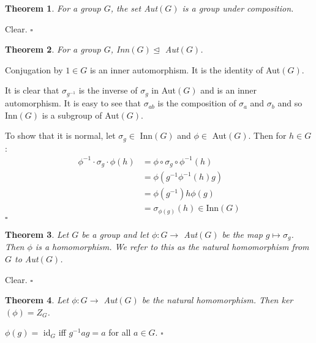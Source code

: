 \documentclass[10pt]{article}
\newtheorem{theorem}{Theorem}[section]
\newenvironment{proof}[1][Proof]{\begin{trivlist}
\item[\hskip \labelsep {\itshape #1}]}{\end{trivlist}}
\begin{document}
\begin{theorem}
For a group $G$, the set Aut$(G)$ is a group under composition.
\end{theorem}

\begin{proof}
Clear. $\square$
\end{proof}

\begin{theorem}
For a group $G$, Inn$(G) \mathrel{\unlhd}$ Aut$(G)$.
\end{theorem}

\begin{proof}
Conjugation by $1 \in G$ is an inner automorphism. It is the identity of Aut$(G)$.

It is clear that $\sigma_{g^{-1}}$ is the inverse of $\sigma_g$ in Aut$(G)$ and is an inner automorphism. It is easy to see that $\sigma_{ab}$ is the composition of $\sigma_a$ and $\sigma_b$ and so Inn$(G)$ is a subgroup of Aut$(G)$.

To show that it is normal, let $\sigma_g \in$ Inn$(G)$ and $\phi \in$ Aut$(G)$. Then for $h \in G$:
\begin{align*}
\phi^{-1}\cdot\sigma_g\cdot\phi(h) &= \phi\circ \sigma_g \circ \phi^{-1}(h)\\
                                   &= \phi(g^{-1}\phi^{-1}(h)g)\\
                                   &= \phi(g^{-1})h\phi(g)\\
                                   &= \sigma_{\phi(g)}(h) \in \mbox{Inn}(G)
\end{align*} $\square$
\end{proof}

\begin{theorem}
Let $G$ be a group and let $\phi : G \to$ Aut$(G)$ be the map $g \mapsto \sigma_g$. Then $\phi$ is a homomorphism. We refer to this as the natural homomorphism from $G$ to Aut$(G)$.
\end{theorem}

\begin{proof}
Clear. $\square$
\end{proof}

\begin{theorem}
Let $\phi : G \to$ Aut$(G)$ be the natural homomorphism. Then ker$(\phi) = Z_G$.
\end{theorem}

\begin{proof}
$\phi(g) =$ id$_G$ iff $g^{-1}ag = a$ for all $a \in G$. $\square$
\end{proof}
\end{document}
